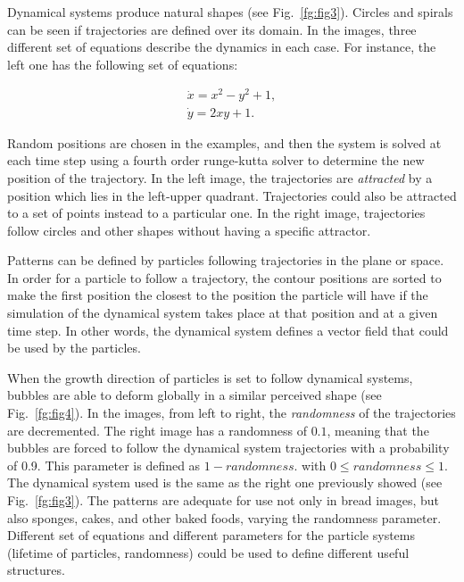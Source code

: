 \documentclass[oneside,a4paper,english,links]{amca}
\begin{document}
Dynamical systems produce natural shapes (see Fig.~\ref{fg:fig3}). Circles and spirals can be seen if trajectories are defined over its domain. In the images, three different set of equations describe the dynamics in each case. For instance, the left one has the following set of equations:

\begin{equation} \label{eq:simple}  
  \begin{aligned}
    \dot{x} = x^{2}-y^{2}+1,\\
    \dot{y} = 2xy+1.
  \end{aligned}
\end{equation}

Random positions are chosen in the examples, and then the system is solved at each time step using a fourth order runge-kutta solver to determine the new position of the trajectory. In the left image, the trajectories are {\em attracted} by a position which lies in the left-upper quadrant. Trajectories could also be attracted to a set of points instead to a particular one. In the right image, trajectories follow circles and other shapes without having a specific attractor.

Patterns can be defined by particles following trajectories in the plane or space. In order for a particle to follow a trajectory, the contour positions are sorted to make the first position the closest to the position the particle will have if the simulation of the dynamical system takes place at that position and at a given time step. In other words, the dynamical system defines a vector field that could be used by the particles.

When the growth direction of particles is set to follow dynamical systems, bubbles are able to deform globally in a similar perceived shape (see Fig.~\ref{fg:fig4}). In the images, from left to right, the {\em randomness} of the trajectories are decremented. The right image has a randomness of $0.1$, meaning that the bubbles are forced to follow the dynamical system trajectories with a probability of 0.9. This parameter is defined as $1-randomness$. with $0 \leq randomness \leq 1$. The dynamical system used is the same as the right one previously showed (see Fig.~\ref{fg:fig3}).
The patterns are adequate for use not only in bread images, but also sponges, cakes, and other baked foods, varying the randomness parameter. Different set of equations and different parameters for the particle systems (lifetime of particles, randomness) could be used to define different useful structures.
\end{document}
